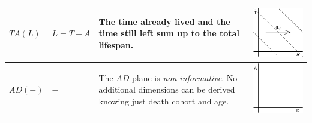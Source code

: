 \documentclass[
  12pt
]{scrartcl}
\begin{document}
\begin{center}
\begin{longtable}{m{}m{}m{}m{}}
  \midrule
  $TA(L)$ & $L = T + A$ &
  The time already lived and the time still left sum up to the total lifespan. &
  \includegraphics[width = \linewidth]{../fig/TAl.pdf} \\
  \midrule
  $AD(-)$ & $-$ &
  The $AD$ plane is \emph{non-informative}. No additional dimensions can be derived knowing just death cohort and age. &
  \includegraphics[width = \linewidth]{../fig/AD.pdf} \\

\end{longtable}
\end{center}
\end{document}

